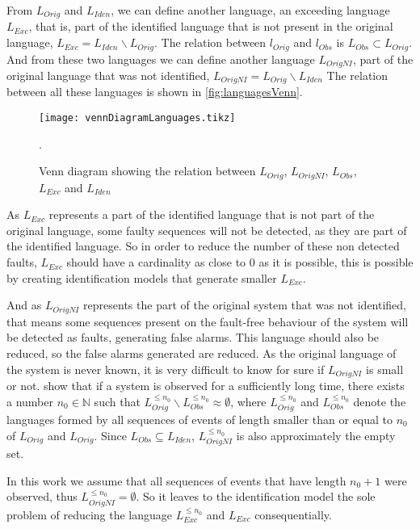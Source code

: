 From $L_{Orig}$ and $L_{Iden}$, we can define another language, an exceeding
language $L_{Exc}$, that is, part of the identified language that is not present in the
original language, $L_{Exc}=L_{Iden}\backslash L_{Orig}$.  The
relation between $l_{Orig}$ and $l_{Obs}$ is $L_{Obs} \subset L_{Orig}$. And from
these two languages we can define another language $L_{OrigNI}$, part of the
original language that was not identified, $L_{OrigNI}=L_{Orig}\backslash L_{Iden}$
The relation between all these languages is shown in \autoref{fig:languagesVenn}.

\usetikzlibrary{patterns}
\begin{figure}[H]
  \centering \texttt{[image: vennDiagramLanguages.tikz]}
  \caption{Venn diagram showing the relation between $L_{Orig}$, $L_{OrigNI}$,
    $L_{Obs}$, $L_{Exc}$ and $L_{Iden}$}.
  \label{fig:languagesVenn}
\end{figure}
As $L_{Exc}$ represents a part of the identified language that is not part of
the original language, some faulty sequences will not be detected, as they are
part of the identified language. So in order to reduce the number of these non
detected faults, $L_{Exc}$ should have a cardinality as close to $0$ as it is
possible, this is possible by creating identification models that generate
smaller $L_{Exc}$.

And as $L_{OrigNI}$ represents the part of the original system that was not
identified, that means some sequences present on the fault-free behaviour of the
system will be detected as faults, generating false alarms. This language should
also be reduced, so the false alarms generated are reduced. As the original
language of the system is never known, it is very difficult to know for sure if
$L_{OrigNI}$ is small or not. \cite{klein2005fault} show that if a system is
observed for a sufficiently long time, there exists a number $n_0\in \mathbb{N}$
such that $L_{Orig}^{\leq n_0}\backslash L_{Obs}^{\leq n_0}\approx \emptyset$,
where $L_{Orig}^{\leq n_0}$ and $L_{Obs}^{\leq n_0}$ denote the languages formed
by all sequences of events of length smaller than or equal to $n_0$ of
$L_{Orig}$ and $L_{Orig}$. Since $L_{Obs}\subseteq L_{Iden}$, $L_{OrigNI}^{\leq
  n_0}$ is also approximately the empty set.

In this work we assume that all
sequences of events that have length $n_0+1$ were observed, thus
$L_{OrigNI}^{\leq n_0}=\emptyset$. So it leaves to the identification model the
sole problem of reducing the language $L_{Exc}^{\leq n_0}$ and $L_{Exc}$ consequentially.

